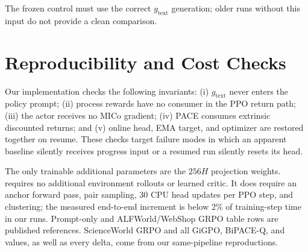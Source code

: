 The frozen control must use the correct $g_{\mathrm{text}}$ generation; older runs without this input do not provide a clean comparison.

\section{Reproducibility and Cost Checks}
\label{app:repro}

Our implementation checks the following invariants: (i) $g_{\mathrm{text}}$ never enters the policy prompt; (ii) process rewards have no consumer in the PPO return path; (iii) the actor receives no MICo gradient; (iv) PACE consumes extrinsic discounted returns; and (v) online head, EMA target, and optimizer are restored together on resume. These checks target failure modes in which an apparent baseline silently receives progress input or a resumed run silently resets its head.

The only trainable additional parameters are the $256H$ projection weights. \method requires no additional environment rollouts or learned critic. It does require an anchor forward pass, pair sampling, 30 CPU head updates per PPO step, and clustering; the measured end-to-end increment is below 2\% of training-step time in our runs. Prompt-only and ALFWorld/WebShop GRPO table rows are published references. ScienceWorld GRPO and all GiGPO, BiPACE-Q, and \method values, as well as every \method delta, come from our same-pipeline reproductions.
